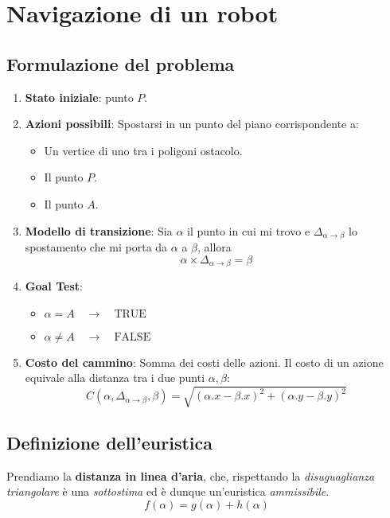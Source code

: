 \section{Navigazione di un robot}
\subsection{Formulazione del problema}
\begin{enumerate}
	\item \textbf{Stato iniziale}: punto $P$.
	\item \textbf{Azioni possibili}: Spostarsi in un punto del piano corrispondente a:
	      \begin{itemize}
		      \item Un vertice di uno tra i poligoni ostacolo.
		      \item Il punto $P$.
		      \item Il punto $A$.
	      \end{itemize}
	\item \textbf{Modello di transizione}: Sia $\alpha$ il punto in cui mi trovo e
	      $\Delta_{\alpha \rightarrow \beta}$ lo spostamento che mi porta da $\alpha$ a $\beta$, allora
	      \[ \alpha \times \Delta_{\alpha \rightarrow \beta} = \beta \]
	\item \textbf{Goal Test}:
	      \begin{itemize}
		      \item $\alpha = A \quad \rightarrow \quad \text{TRUE}$
		      \item $\alpha \neq A \quad \rightarrow \quad \text{FALSE}$
	      \end{itemize}
	\item \textbf{Costo del cammino}: Somma dei costi delle azioni. Il costo di un
	      azione equivale alla distanza tra i due punti $\alpha, \beta$:
	      \[
		      C(\alpha, \Delta_{\alpha \rightarrow \beta}, \beta) =
		      \sqrt{(\alpha.x - \beta.x)^2 + (\alpha.y - \beta.y)^2}
	      \]
\end{enumerate}

\subsection{Definizione dell'euristica}
Prendiamo la \textbf{distanza in linea d'aria}, che, rispettando la
\emph{disuguaglianza triangolare} \`e una \emph{sottostima} ed \`e dunque un'euristica
\emph{ammissibile}.
\[ f(\alpha) = g(\alpha) + h(\alpha) \]